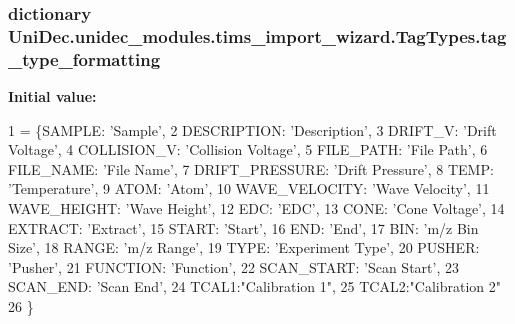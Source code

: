 \subsubsection[{tag\+\_\+type\+\_\+formatting}]{\setlength{\rightskip}{0pt plus 5cm}dictionary Uni\+Dec.\+unidec\+\_\+modules.\+tims\+\_\+import\+\_\+wizard.\+Tag\+Types.\+tag\+\_\+type\+\_\+formatting}\label{namespace_uni_dec_1_1unidec__modules_1_1tims__import__wizard_1_1_tag_types_a2311492a7a9deffef8061b13699831a9}
{\bfseries Initial value\+:}
\begin{DoxyCode}
1 = \{SAMPLE: \textcolor{stringliteral}{'Sample'},
2                        DESCRIPTION: \textcolor{stringliteral}{'Description'},
3                        DRIFT\_V: \textcolor{stringliteral}{'Drift Voltage'},
4                        COLLISION\_V: \textcolor{stringliteral}{'Collision Voltage'},
5                        FILE\_PATH: \textcolor{stringliteral}{'File Path'},
6                        FILE\_NAME: \textcolor{stringliteral}{'File Name'},
7                        DRIFT\_PRESSURE: \textcolor{stringliteral}{'Drift Pressure'},
8                        TEMP: \textcolor{stringliteral}{'Temperature'},
9                        ATOM: \textcolor{stringliteral}{'Atom'},
10                        WAVE\_VELOCITY: \textcolor{stringliteral}{'Wave Velocity'},
11                        WAVE\_HEIGHT: \textcolor{stringliteral}{'Wave Height'},
12                        EDC: \textcolor{stringliteral}{'EDC'},
13                        CONE: \textcolor{stringliteral}{'Cone Voltage'},
14                        EXTRACT: \textcolor{stringliteral}{'Extract'},
15                        START: \textcolor{stringliteral}{'Start'},
16                        END: \textcolor{stringliteral}{'End'},
17                        BIN: \textcolor{stringliteral}{'m/z Bin Size'},
18                        RANGE: \textcolor{stringliteral}{'m/z Range'},
19                        TYPE: \textcolor{stringliteral}{'Experiment Type'},
20                        PUSHER: \textcolor{stringliteral}{'Pusher'},
21                        FUNCTION: \textcolor{stringliteral}{'Function'},
22                        SCAN\_START: \textcolor{stringliteral}{'Scan Start'},
23                        SCAN\_END: \textcolor{stringliteral}{'Scan End'},
24                        TCAL1:\textcolor{stringliteral}{"Calibration 1"},
25                        TCAL2:\textcolor{stringliteral}{"Calibration 2"}
26                        \}
\end{DoxyCode}
\hypertarget{namespace_uni_dec_1_1unidec__modules_1_1tims__import__wizard_1_1_tag_types_aecf4cf9b2ede59e333249bca2052e301}{}
